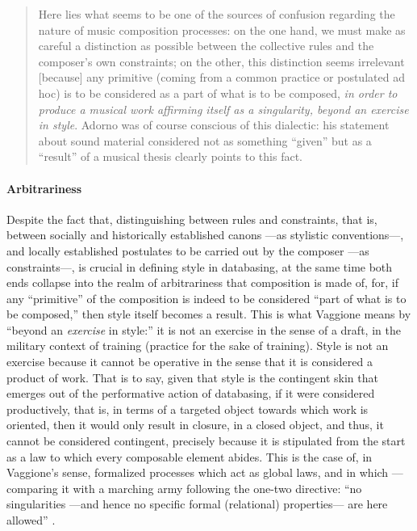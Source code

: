 \begin{quote}
	Here lies what seems to be one of the sources of confusion regarding the nature of music composition processes: on the one hand, we must make as careful a distinction as possible between the collective rules and the composer's own constraints; on the other, this distinction seems irrelevant [because] any primitive (coming from a common practice or postulated ad hoc) is to be considered as a part of what is to be composed, \textit{in order to produce a musical work affirming itself as a singularity, beyond an exercise in style}. Adorno was of course conscious of this dialectic: his statement about sound material considered not as something ``given'' but as a ``result'' of a musical thesis clearly points to this fact. \im \parencite[59]{Vag01:Som}
\end{quote}

\paragraph{Arbitrariness}
Despite the fact that, distinguishing between rules and constraints, that is, between socially and historically established canons ---as stylistic conventions---, and locally established postulates to be carried out by the composer ---as constraints---, is crucial in defining style in databasing, at the same time both ends collapse into the realm of arbitrariness that composition is made of, for, if any ``primitive'' of the composition is indeed to be considered ``part of what is to be composed,'' then style itself becomes a result. This is what Vaggione means by ``beyond an \textit{exercise} in style:'' it is not an exercise in the sense of a draft, in the military context of training (practice for the sake of training). Style is not an exercise because it cannot be operative in the sense that it is considered a product of work. That is to say, given that style is the contingent skin that emerges out of the performative action of databasing, if it were considered productively, that is, in terms of a targeted object towards which work is oriented, then it would only result in closure, in a closed object, and thus, it cannot be considered contingent, precisely because it is stipulated from the start as a law to which every composable element abides. This is the case of, in Vaggione's sense, formalized processes which act as global laws, and in which ---comparing it with a marching army following the one-two directive: ``no singularities ---and hence no specific formal (relational) properties--- are here allowed'' \parencite[101]{Vag93:Det}.

